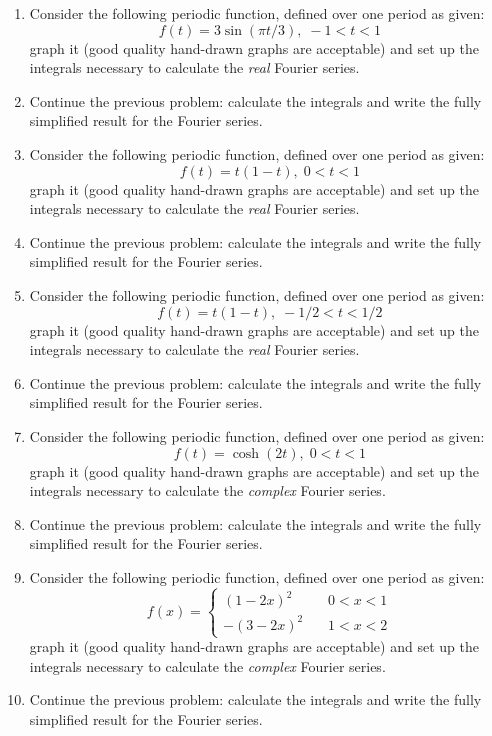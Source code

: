 \documentclass[fleqn]{article}
\begin{document}
\begin{enumerate}

  \item Consider the following periodic function, defined over one period as given: 
  $$
  f\left( t\right) =3\sin \left( \pi t/3\right) ,\;-1<t<1
  $$
  graph it (good quality hand-drawn graphs are acceptable) and set up the integrals necessary to calculate the \emph{real} Fourier series. 
  
  \item Continue the previous problem:  calculate the integrals and write the fully simplified result for the Fourier series. 
  
  
  \item Consider the following periodic function, defined over one period as given: 
  $$
  f\left( t\right) =t\left( 1-t\right) ,\;0<t<1
  $$
  graph it (good quality hand-drawn graphs are acceptable) and set up the integrals necessary to calculate the \emph{real} Fourier series. 
  
  
  \item Continue the previous problem:  calculate the integrals and write the fully simplified result for the Fourier series. 
  
  
  \item Consider the following periodic function, defined over one period as given: 
  $$
  f\left( t\right) =t\left( 1-t\right) ,\;-1/2<t<1/2
  $$
  graph it (good quality hand-drawn graphs are acceptable) and set up the integrals necessary to calculate the \emph{real} Fourier series. 
  
  
  \item Continue the previous problem:  calculate the integrals and write the fully simplified result for the Fourier series. 
  
  
  \item Consider the following periodic function, defined over one period as given: 
  \[
  f\left( t\right) =\cosh \left( 2t\right) ,\;0<t<1
  \]
  graph it (good quality hand-drawn graphs are acceptable) and set up the integrals necessary to calculate the \emph{complex} Fourier series. 
  
  
  \item Continue the previous problem:  calculate the integrals and write the fully simplified result for the Fourier series. 
  
  
  \item Consider the following periodic function, defined over one period as given: 
  \[
  f\left( x\right) =\left\{ 
  \begin{array}{rrr}
  \left( 1-2x\right) ^{2} & \, & 0<x<1 \\ 
  -\left( 3-2x\right) ^{2} & \, & 1<x<2
  \end{array}
  \right. 
  \]
  graph it (good quality hand-drawn graphs are acceptable) and set up the integrals necessary to calculate the \emph{complex} Fourier series. 
  
  
  \item Continue the previous problem:  calculate the integrals and write the fully simplified result for the Fourier series. 
  
  
  \end{enumerate}

\pagebreak
\end{document}
